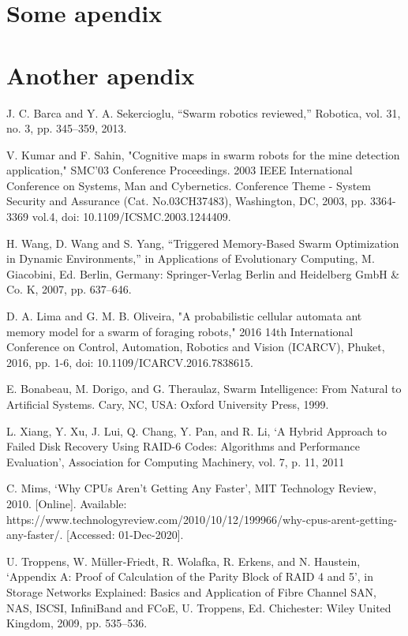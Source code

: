 \documentclass{UoYCSproject}
\begin{document}
\appendix
\chapter{Some apendix}


\chapter{Another apendix}


\begin{thebibliography}{100}
J. C. Barca and Y. A. Sekercioglu, “Swarm robotics reviewed,” Robotica, vol. 31, no. 3, pp. 345–359, 2013.

V. Kumar and F. Sahin, "Cognitive maps in swarm robots for the mine detection application," SMC'03 Conference Proceedings. 2003 IEEE International Conference on Systems, Man and Cybernetics. Conference Theme - System Security and Assurance (Cat. No.03CH37483), Washington, DC, 2003, pp. 3364-3369 vol.4, doi: 10.1109/ICSMC.2003.1244409.

H. Wang, D. Wang and S. Yang, “Triggered Memory-Based Swarm Optimization in Dynamic Environments,” in Applications of Evolutionary Computing, M. Giacobini, Ed. Berlin, Germany: Springer-Verlag Berlin and Heidelberg GmbH \& Co. K, 2007, pp. 637–646.

D. A. Lima and G. M. B. Oliveira, "A probabilistic cellular automata ant memory model for a swarm of foraging robots," 2016 14th International Conference on Control, Automation, Robotics and Vision (ICARCV), Phuket, 2016, pp. 1-6, doi: 10.1109/ICARCV.2016.7838615.

E. Bonabeau, M. Dorigo, and G. Theraulaz, Swarm Intelligence: From Natural to Artificial Systems. Cary, NC, USA: Oxford University Press, 1999.

L. Xiang, Y. Xu, J. Lui, Q. Chang, Y. Pan, and R. Li, ‘A Hybrid Approach to Failed Disk Recovery Using RAID-6 Codes: Algorithms and Performance Evaluation’, Association for Computing Machinery, vol. 7, p. 11, 2011

C. Mims, ‘Why CPUs Aren’t Getting Any Faster’, MIT Technology Review, 2010. [Online]. Available: https://www.technologyreview.com/2010/10/12/199966/why-cpus-arent-getting-any-faster/. [Accessed: 01-Dec-2020].

U. Troppens, W. Müller‐Friedt, R. Wolafka, R. Erkens, and N. Haustein, ‘Appendix A: Proof of Calculation of the Parity Block of RAID 4 and 5’, in Storage Networks Explained: Basics and Application of Fibre Channel SAN, NAS, ISCSI, InfiniBand and FCoE, U. Troppens, Ed. Chichester: Wiley United Kingdom, 2009, pp. 535–536.


\end{thebibliography}
\end{document}
